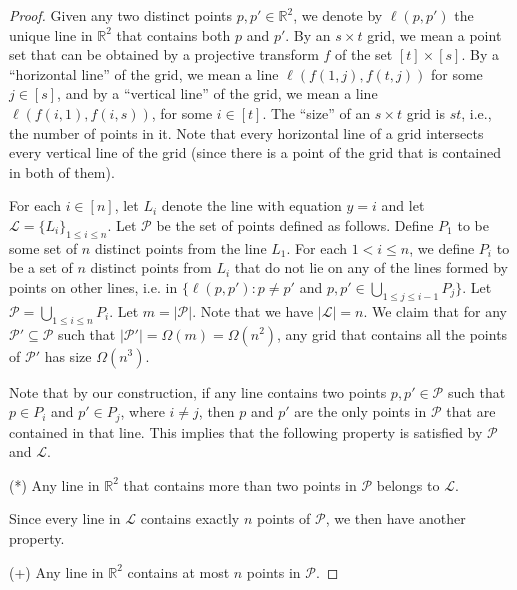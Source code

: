 \documentclass[
final
]{dmtcs-episciences}
\numberwithin{equation}{subsection}
\begin{document}
\begin{proof}		
	Given any two distinct points $p,p'\in\mathbb{R}^2$, we denote by $\ell(p,p')$ the unique line in $\mathbb{R}^2$ that contains both $p$ and $p'$.
	By an $s\times t$ grid, we mean a point set that can be obtained by a projective transform $f$ of the set $[t]\times [s]$. By a ``horizontal line'' of the grid, we mean a line $\ell(f(1,j),f(t,j))$ for some $j\in [s]$, and by a ``vertical line'' of the grid, we mean a line $\ell(f(i,1),f(i,s))$, for some $i\in [t]$. The ``size'' of an $s\times t$ grid is $st$, i.e., the number of points in it. Note that every horizontal line of a grid intersects every vertical line of the grid (since there is a point of the grid that is contained in both of them).
	
	\medskip	
	
	For each $i\in [n]$, let $L_i$ denote the line with equation $y=i$ and let $\mathcal{L}=\{L_i\}_{1\leq i\leq n}$.
	Let $\mathcal{P}$ be the set of points defined as follows. Define $P_1$ to be some set of $n$ distinct points from the line $L_1$. For each $1<i\leq n$, we define $P_i$ to be a set of $n$ distinct points from $L_i$ that do not lie on any of the lines formed by points on other lines, i.e. in $\{\ell(p,p')\colon p\neq p'$ and $p,p'\in\bigcup_{1\leq j\leq i-1} P_j\}$. Let $\mathcal{P}=\bigcup_{1\leq i\leq n} P_i$. Let $m=|\mathcal{P}|$. Note that we have $|\mathcal{L}|=n$. We claim that for any $\mathcal{P}'\subseteq\mathcal{P}$ such that $|\mathcal{P'}|=\Omega(m)=\Omega(n^2)$, any grid that contains all the points of $\mathcal{P}'$ has size $\Omega(n^3)$. 
	
	\medskip		
	
	Note that by our construction, if any line contains two points $p,p'\in\mathcal{P}$ such that $p\in P_i$ and $p'\in P_j$, where $i\neq j$, then $p$ and $p'$ are the only points in $\mathcal{P}$ that are contained in that line. This implies that the following property is satisfied by $\mathcal{P}$ and $\mathcal{L}$.
	\medskip
	
	\noindent (*) Any line in $\mathbb{R}^2$ that contains more than two points in $\mathcal{P}$ belongs to $\mathcal{L}$.
	\medskip
	
	Since every line in $\mathcal{L}$ contains exactly $n$ points of $\mathcal{P}$, we then have another property.
	\medskip
	
	\noindent (+) Any line in $\mathbb{R}^2$ contains at most $n$ points in $\mathcal{P}$.
	\medskip
	

\end{proof}
\end{document}

